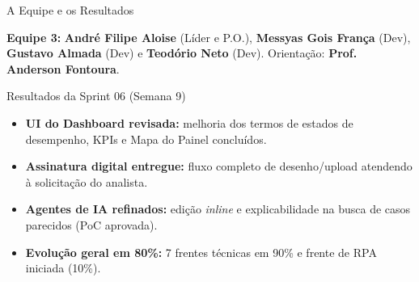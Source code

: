 \documentclass[11pt]{article}
\begin{document}
\noindent\begin{minipage}[t]{0.37\textwidth}
\begin{card}[equal height group=fim]{A Equipe e os Resultados}
{\footnotesize
\textbf{Equipe 3:} \textbf{André Filipe Aloise} (Líder e P.O.), \textbf{Messyas Gois França} (Dev), \textbf{Gustavo Almada} (Dev) e \textbf{Teodório Neto} (Dev). Orientação: \textbf{Prof. Anderson Fontoura}.\vspace{5pt}

{\normalsize\lghead\color{lgred}Resultados da Sprint 06 (Semana 9)}\vspace{1pt}
\begin{itemize}
  \item \textbf{UI do Dashboard revisada:} melhoria dos termos de estados de desempenho, KPIs e Mapa do Painel concluídos.
  \item \textbf{Assinatura digital entregue:} fluxo completo de desenho/upload atendendo à solicitação do analista.
  \item \textbf{Agentes de IA refinados:} edição \textit{inline} e explicabilidade na busca de casos parecidos (PoC aprovada).
  \item \textbf{Evolução geral em 80\%:} 7 frentes técnicas em 90\% e frente de RPA iniciada (10\%).
\end{itemize}}
\end{card}
\end{minipage}\hfill
\end{document}
